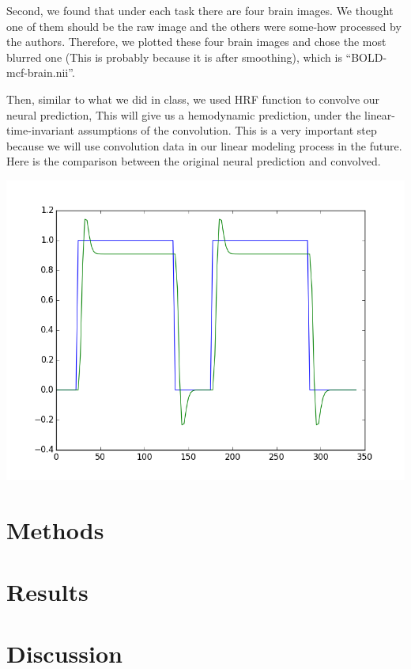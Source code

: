 \documentclass[11pt]{article}
\begin{document}
Second, we found that under each task there are four brain images. We thought one of them should be the raw image and the others were some-how processed by the authors. Therefore, we plotted these four brain images and chose the most blurred one (This is probably because it is after smoothing), which is ``BOLD-mcf-brain.nii''. 

Then, similar to what we did in class, we used HRF function to convolve our neural prediction, This will give us a hemodynamic prediction, under the linear-time-invariant assumptions of the convolution. This is a very important step because we will use convolution data in our linear modeling process in the future. Here is the comparison between the original neural prediction and convolved.

\includegraphics{task001_run001_conv005}

\section{Methods}
\section{Results}
\section{Discussion}



\end{document}
